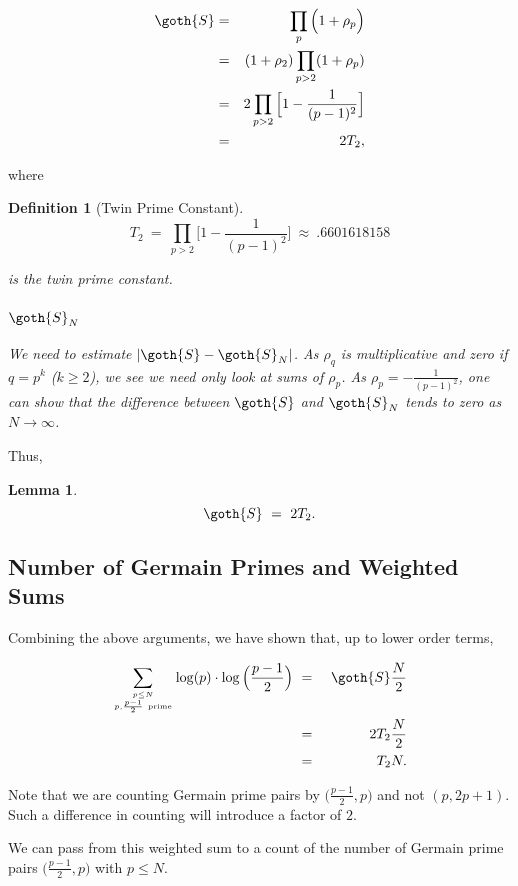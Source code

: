 \documentclass[12pt,letterpaper]{report}
\newcommand\be{\begin{equation}}
\newcommand\ee{\end{equation}}
\newcommand\bea{\begin{eqnarray}}
\newcommand\eea{\end{eqnarray}}
\newtheorem{lem}[thm]{Lemma}
\newtheorem{defi}[thm]{Definition}
\begin{document}
\bea \goth{S} &=& \prod_p \Big(1 + \rho_p\Big) \nonumber\\ &=& (1
+ \rho_2) \prod_{p > 2} (1 + \rho_p) \nonumber\\ &=& 2 \prod_{p>2}
\Big[ 1 - \frac{1}{(p-1)^2} \Big] \nonumber\\ &=& 2 T_2, \eea

where

\begin{defi}[Twin Prime Constant]

\be T_2 \ = \ \prod_{p > 2} \Big[ 1 - \frac{1}{(p-1)^2} \Big] \
\approx \ .6601618158 \ee

is the twin prime constant.


\subsubsection{$\goth{S}_N$}

We need to estimate $|\goth{S} - \goth{S}_N|$. As $\rho_q$ is
multiplicative and zero if $q = p^k$ ($k \ge 2$), we see we need
only look at sums of $\rho_p$. As $\rho_p = -\frac{1}{(p-1)^2}$,
one can show that the difference between $\goth{S}$ and
$\goth{S}_N$ tends to zero as $N \to \infty$.



\end{defi}

Thus,


\begin{lem}
\be \goth{S} \ = \ 2 T_2. \ee
\end{lem}




\subsection{Number of Germain Primes and Weighted Sums}

Combining the above arguments, we have shown that, up to lower
order terms,

\bea \sum_{p \le N \atop p, \frac{p-1}{2} \ \text{prime} } \log(p)
\cdot \log\Big( \frac{p-1}{2} \Big) & \ = \ & \goth{S} \frac{N}{2}
\nonumber\\ & \ = \ & 2 T_2 \frac{N}{2} \nonumber\\ & \ = \ & T_2
N. \eea

Note that we are counting Germain prime pairs by $\Big(
\frac{p-1}{2},p\Big)$ and not $(p, 2p+1)$. Such a difference in
counting will introduce a factor of $2$.

We can pass from this weighted sum to a count of the number of
Germain prime pairs $\Big( \frac{p-1}{2},p\Big)$ with $p \le N$.
\end{document}
